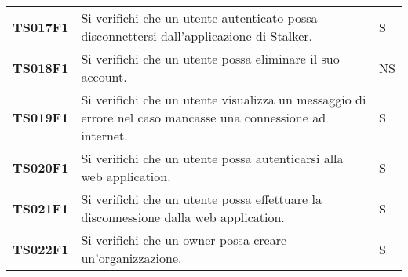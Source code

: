 \documentclass[../../piano-di-qualifica.tex]{subfiles}
\begin{document}
\begin{longtable}[H]{>{\centering\bfseries}m{3cm} >{}m{10cm} >{\centering\arraybackslash}m{3cm}}
  TS017F1            & Si verifichi che un utente autenticato possa disconnettersi dall'applicazione di Stalker.
                     & S                                                                                                                                                                                                                                                   \\

  TS018F1            & Si verifichi che un utente possa eliminare il suo account.
                     & NS                                                                                                                                                                                                                                                  \\

  TS019F1            & Si verifichi che un utente visualizza un messaggio di errore nel caso mancasse una connessione ad internet.
                     & S                                                                                                                                                                                                                                                   \\

  TS020F1            & Si verifichi che un utente possa autenticarsi alla web application.
                     & S                                                                                                                                                                                                                                                   \\

  TS021F1            & Si verifichi che un utente possa effettuare la disconnessione dalla web application.
                     & S                                                                                                                                                                                                                                                   \\

  TS022F1            & Si verifichi che un owner possa creare un'organizzazione.
                     & S                                                                                                                                                                                                                                                   \\


\end{longtable}
\end{document}
